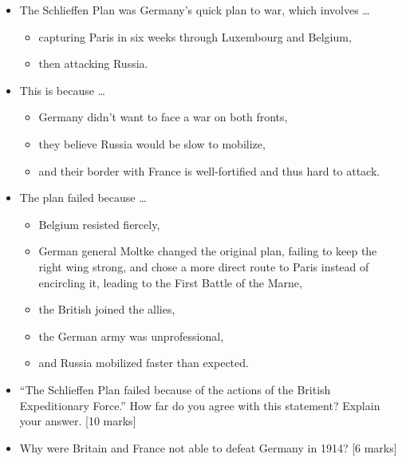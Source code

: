 \documentclass[a4paper,numbers=endperiod,most,twoside,english,final,openany]{scrbook} %
\newcommand\igcsemarks[1]{ [#1 marks]}
\begin{document}
\vfill
\begin{summary}
  \begin{itemize}
    \item The Schlieffen Plan was Germany's quick plan to war, which involves \ldots
      \begin{itemize}
        \item capturing Paris in six weeks through Luxembourg and Belgium,
        \item then attacking Russia.
      \end{itemize}
    \item This is because \ldots
      \begin{itemize}
        \item Germany didn't want to face a war on both fronts,
        \item they believe Russia would be slow to mobilize,
        \item and their border with France is well-fortified and thus hard to attack.
      \end{itemize}
    \item The plan failed because \ldots
      \begin{itemize}
        \item Belgium resisted fiercely,
        \item German general Moltke changed the original plan, failing to keep the right wing strong, and chose a more direct route to Paris instead of encircling it, leading to the First Battle of the Marne,
        \item the British joined the allies,
        \item the German army was unprofessional,
        \item and Russia mobilized faster than expected.
      \end{itemize}
  \end{itemize}
\end{summary}

\begin{ppq}
  \begin{itemize}
    \item ``The Schlieffen Plan failed because of the actions of the British Expeditionary Force.'' How far do you agree with this statement? Explain your answer.\igcsemarks{10}
    \item Why were Britain and France not able to defeat Germany in 1914?\igcsemarks{6}
  \end{itemize}
\end{ppq}
\end{document}
